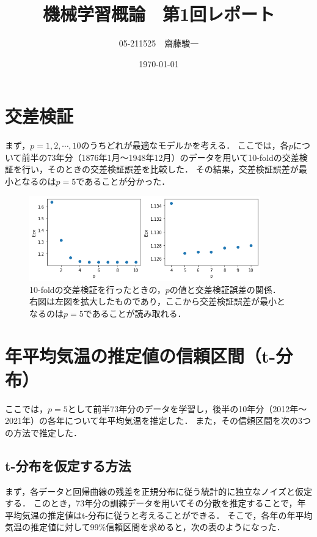 \documentclass[a4paper,11pt]{jsarticle}
\begin{document}
\title{機械学習概論　第1回レポート}
\author{05-211525　齋藤駿一}
\date{\today}
\maketitle

\section{交差検証}
まず，$p=1,2,\cdots, 10$のうちどれが最適なモデルかを考える．
ここでは，各$p$について前半の73年分（1876年1月～1948年12月）のデータを用いて10-foldの交差検証を行い，そのときの交差検証誤差を比較した．
その結果，交差検証誤差が最小となるのは$p=5$であることが分かった．

\begin{figure}[htbp]
  \centering
  \includegraphics[width=10cm]{cv.png}
  \caption{10-foldの交差検証を行ったときの，$p$の値と交差検証誤差の関係．右図は左図を拡大したものであり，ここから交差検証誤差が最小となるのは$p=5$であることが読み取れる．}
  \label{fig:cv}
\end{figure}

\section{年平均気温の推定値の信頼区間（t-分布）}
ここでは，$p=5$として前半73年分のデータを学習し，後半の10年分（2012年～2021年）の各年について年平均気温を推定した．
また，その信頼区間を次の3つの方法で推定した．

\subsection{t-分布を仮定する方法}
まず，各データと回帰曲線の残差を正規分布に従う統計的に独立なノイズと仮定する．
このとき，73年分の訓練データを用いてその分散を推定することで，年平均気温の推定値はt-分布に従うと考えることができる．
そこで，各年の年平均気温の推定値に対して99\%信頼区間を求めると，次の表のようになった．
\end{document}

